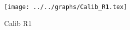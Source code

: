 \begin{figure}[h] \centering\texttt{[image: ../../graphs/Calib\_R1.tex]}\caption{Calib R1}\label{gr:Calib_R1} \end{figure}
